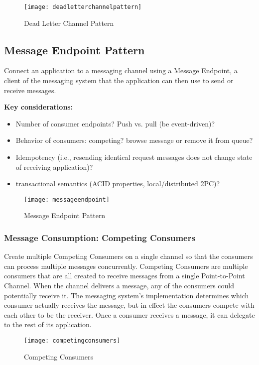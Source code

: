 \begin{figure}[H]
  \center
  \texttt{[image: deadletterchannelpattern]}
  \caption{Dead Letter Channel Pattern}
\end{figure}

\subsection{Message Endpoint Pattern}
Connect an application to a messaging channel using a Message Endpoint, a client of the messaging system that the application can then use to send or receive messages.

\textbf{Key considerations:}
\begin{itemize}
	\item Number of consumer endpoints? Push vs. pull (be event-driven)?
	\item Behavior of consumers: competing? browse message or remove it from queue?
	\item Idempotency (i.e., resending identical request messages does not change state of receiving application)?
	\item transactional semantics (ACID properties, local/distributed 2PC)?
\end{itemize}

\begin{figure}[H]
  \center
  \texttt{[image: messageendpoint]}
  \caption{Message Endpoint Pattern}
\end{figure}

\subsubsection{Message Consumption: Competing Consumers}
Create multiple Competing Consumers on a single channel so that the consumers can process multiple messages concurrently. Competing Consumers are multiple consumers that are all created to receive messages from a single Point-to-Point Channel. When the channel delivers a message, any of the consumers could potentially receive it. The messaging system's implementation determines which consumer actually receives the message, but in effect the consumers compete with each other to be the receiver. Once a consumer receives a message, it can delegate to the rest of its application.

\begin{figure}[H]
  \center
  \texttt{[image: competingconsumers]}
  \caption{Competing Consumers}
\end{figure}

